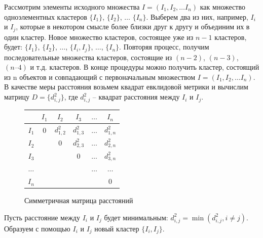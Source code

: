 \documentclass[a4paper,14pt,openany,final]{extreport} %
\def\oldcaption{} \let\oldcaption=\caption
\def\caption{\stepcounter{captionsnum}\oldcaption}
\begin{document}
{Рассмотрим элементы исходного множества $Ι = (Ι_1, Ι_2, \ldots Ι_n)$ как множество одноэлементных кластеров $\{Ι_1\}$, $\{Ι_2\}$, $\ldots$ $\{Ι_n\}$. Выберем два из них, например, $Ι_i$ и $Ι_j$, которые в некотором смысле более близки друг к другу и объединим их в один кластер. Новое множество кластеров, состоящее уже из $n-1$ кластеров, будет: $\{Ι_1\}$, $\{Ι_2\}$, $\ldots$, $\{Ι_i , Ι_j\}$, $\ldots$, $\{Ι_n\}$. Повторяя процесс, получим последовательные множества кластеров, состоящие из $(n-2)$, $(n-3)$, $(n–4)$ и т.д. кластеров. В конце процедуры можно получить кластер, состоящий из n объектов и совпадающий с первоначальным множеством $Ι = (Ι_1, Ι_2, \ldots Ι_n)$. В качестве меры расстояния возьмем квадрат евклидовой метрики и вычислим матрицу $D= \{d_{i,j}^2 \}$, где $d_{i,j}^2$ -- квадрат расстояния между $Ι_i$ и $Ι_j$.

\begin{figure}[htbp]
  \centering
  \begin{tabular}{|c||c|c|c|c|c|}
    \hline
          & $I_1$ & $I_2$       & $I_3$       & $\ldots$ & $I_n$        \\
    \hline
    \hline
    $I_1$ & 0     & $d_{1,2}^2$ & $d_{1,3}^2$ & $\ldots$ & $d_{1,n}^2$  \\
    \hline
    $I_2$ &       & 0           & $d_{2,3}^2$ & $\ldots$ & $d_{2,n}^2$  \\
    \hline
    $I_3$ &       &             & 0           & $\ldots$ & $d_{3,n}^2$  \\
    \hline
 $\ldots$ &       &             &             & $\ldots$ & $\ldots$ \\
    \hline
    $I_n$ &       &             &             &          & 0  \\
    \hline
  \end{tabular}
  \caption{Симметричная матрица расстояний}
  \label{fig:disssimm}
\end{figure}
Пусть расстояние между $Ι_i$ и $Ι_j$ будет минимальным: $d_{i,j}^2=\min⁡(d_{i,j}^2,i\neq j)$. Образуем с помощью $Ι_i$ и $Ι_j$ новый кластер $\{Ι_i, Ι_j\}.$

}
\end{document}
